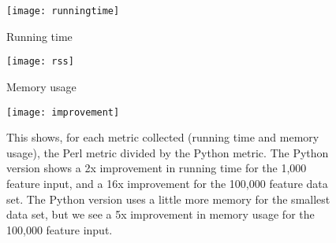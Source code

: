 \documentclass[10pt,twocolumn]{report}
\begin{document}
\begin{figure}
  \centering
  \texttt{[image: runningtime]}  
  \caption{Running time}
\end{figure}

\begin{figure}
  \centering
  \texttt{[image: rss]}  
  \caption{Memory usage}
\end{figure}


\begin{figure}
  \centering
  \texttt{[image: improvement]}  
  \caption{This shows, for each metric collected (running time and
    memory usage), the Perl metric divided by the Python metric. The
    Python version shows a 2x improvement in running time for the
    1,000 feature input, and a 16x improvement for the 100,000 feature
    data set. The Python version uses a little more memory for the
    smallest data set, but we see a 5x improvement in memory usage for
    the 100,000 feature input.}
  
\end{figure}
\end{document}

